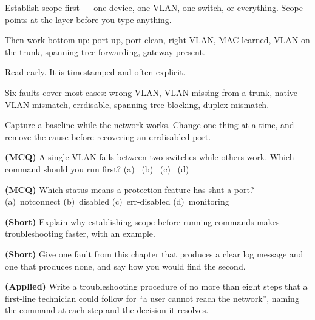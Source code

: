 \begin{chaptersummary}
\begin{tight}
  \item Establish scope first --- one device, one VLAN, one switch, or everything.
        Scope points at the layer before you type anything.
  \item Then work bottom-up: port up, port clean, right VLAN, MAC learned, VLAN on
        the trunk, spanning tree forwarding, gateway present.
  \item Read  early. It is timestamped and often explicit.
  \item Six faults cover most cases: wrong VLAN, VLAN missing from a trunk, native
        VLAN mismatch, errdisable, spanning tree blocking, duplex mismatch.
  \item Capture a baseline while the network works. Change one thing at a time,
        and remove the cause before recovering an errdisabled port.
\end{tight}
\end{chaptersummary}

\begin{reviewq}
  \item \textbf{(MCQ)} A single VLAN fails between two switches while others work.
        Which command should you run first?
        (a)~ (b)~
        (c)~ (d)~
  \item \textbf{(MCQ)} Which status means a protection feature has shut a port?
        (a)~notconnect (b)~disabled (c)~err-disabled (d)~monitoring
  \item \textbf{(Short)} Explain why establishing scope before running commands
        makes troubleshooting faster, with an example.
  \item \textbf{(Short)} Give one fault from this chapter that produces a clear
        log message and one that produces none, and say how you would find the
        second.
  \item \textbf{(Applied)} Write a troubleshooting procedure of no more than eight
        steps that a first-line technician could follow for ``a user cannot reach
        the network'', naming the command at each step and the decision it
        resolves.
\end{reviewq}

